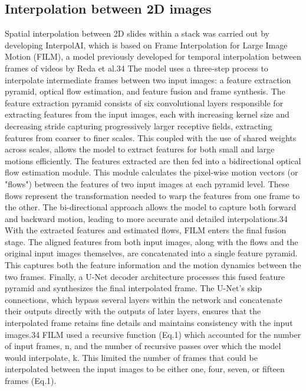 \begin{refsection}
    \subsection{Interpolation between 2D images}
    Spatial interpolation between 2D slides within a stack was carried out by developing InterpolAI, which is based on Frame Interpolation for Large Image Motion (FILM), a model previously developed for temporal interpolation between frames of videos by Reda et al.34 The model uses a three-step process to interpolate intermediate frames between two input images: a feature extraction pyramid, optical flow estimation, and feature fusion and frame synthesis. 
    The feature extraction pyramid consists of six convolutional layers responsible for extracting features from the input images, each with increasing kernel size and decreasing stride capturing progressively larger receptive fields, extracting features from coarser to finer scales. This coupled with the use of shared weights across scales, allows the model to extract features for both small and large motions efficiently.
    The features extracted are then fed into a bidirectional optical flow estimation module. This module calculates the pixel-wise motion vectors (or "flows") between the features of two input images at each pyramid level. These flows represent the transformation needed to warp the features from one frame to the other. The bi-directional approach allows the model to capture both forward and backward motion, leading to more accurate and detailed interpolations.34
    With the extracted features and estimated flows, FILM enters the final fusion stage. The aligned features from both input images, along with the flows and the original input images themselves, are concatenated into a single feature pyramid. This captures both the feature information and the motion dynamics between the two frames. Finally, a U-Net decoder architecture processes this fused feature pyramid and synthesizes the final interpolated frame. The U-Net's skip connections, which bypass several layers within the network and concatenate their outputs directly with the outputs of later layers, ensures that the interpolated frame retains fine details and maintains consistency with the input images.34
    FILM used a recursive function (Eq.1) which accounted for the number of input frames, n, and the number of recursive passes over which the model would interpolate, k. This limited the number of frames that could be interpolated between the input images to be either one, four, seven, or fifteen frames (Eq.1).
    \begin{equation} 

\end{equation}
\end{refsection}
